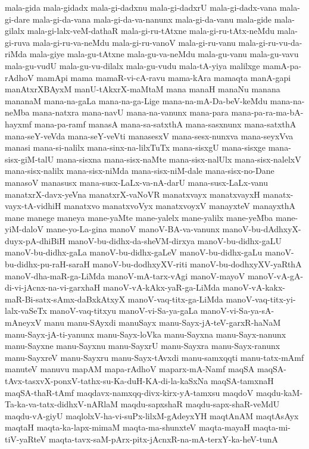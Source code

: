 {mala-gida
mala-gidadx
mala-gi-dadxnu
mala-gi-dadxrU
mala-gi-dadx-vana
mala-gi-dare
mala-gi-da-vana
mala-gi-da-va-nanunx
mala-gi-da-vanu
mala-gide
mala-gilalx
mala-gi-lalx-veM-dathaR
mala-gi-ru-tAtxne
mala-gi-ru-tAtx-neMdu
mala-gi-ruva
mala-gi-ru-va-neMdu
mala-gi-ru-vanoV
mala-gi-ru-vanu
mala-gi-ru-vu-da-riMda
mala-giye
mala-gu-tAtxne
mala-gu-va-neMdu
mala-gu-vanu
mala-gu-vavu
mala-gu-vudU
mala-gu-vu-dilalx
mala-gu-vudu
mala-tA-yiya
malilxge
mamA-pa-rAdhoV
mamApi
mama
mamaR-vi-cA-ravu
mama-kAra
mamaqta
manA-gapi
manAtxrXBAyxM
manU-tAkxrX-maMtaM
mana
manaH
manaNu
manana
mananaM
mana-na-gaLa
mana-na-ga-Lige
mana-na-mA-Da-beV-keMdu
mana-na-neMba
mana-natxra
mana-navU
mana-na-vanunx
mana-para
mana-pa-ra-ma-bA-hayxmf
mana-pa-ramf
manasA
mana-sa-satxthA
mana-sasxnunx
mana-satxthA
mana-seY-veVda
mana-seY-veVti
manasesxV
mana-sesx-nunxva
mana-seyxVva
manasi
mana-si-nalilx
mana-sinx-na-lilxTuTx
mana-sisxgU
mana-sisxge
mana-sisx-giM-talU
mana-sisxna
mana-sisx-naMte
mana-sisx-nalUlx
mana-sisx-nalelxV
mana-sisx-nalilx
mana-sisx-niMda
mana-sisx-niM-dale
mana-sisx-no-Dane
manasoV
manasusx
mana-susx-LaLx-va-nA-darU
mana-susx-LaLx-vanu
manatxrX-davx-yeVna
manatxrX-vaNoVR
manatxvayx
manatxvayxH
manatx-vayx-tA-vidhiH
manatxvo
manatxvoVyx
manatxvoyxV
manayxteV
manayxthA
mane
manege
maneya
mane-yaMte
mane-yalelx
mane-yalilx
mane-yeMba
mane-yiM-daloV
mane-yo-La-gina
manoV
manoV-BA-va-vanunx
manoV-bu-dAdhxyX-duyx-pA-dhiBiH
manoV-bu-didhx-da-sheVM-dirxya
manoV-bu-didhx-gaLU
manoV-bu-didhx-gaLa
manoV-bu-didhx-gaLeV
manoV-bu-didhx-gaLu
manoV-bu-didhx-pu-raH-saraH
manoV-bu-dodhxyXV-riti
manoV-bu-dodhxyXV-yaRthA
manoV-dha-maR-ga-LiMda
manoV-mA-tarx-vAgi
manoV-mayoV
manoV-vA-gA-di-vi-jAcnx-na-vi-garxhaH
manoV-vA-kAkx-yaR-ga-LiMda
manoV-vA-kakx-maR-Bi-satx-sAmx-daBxkAtxyX
manoV-vaq-titx-ga-LiMda
manoV-vaq-titx-yi-lalx-vaSeTx
manoV-vaq-titxyu
manoV-vi-Sa-ya-gaLa
manoV-vi-Sa-ya-sA-mAneyxV
manu
manu-SAyxdi
manuSayx
manu-Sayx-jA-teV-garxR-haNaM
manu-Sayx-jA-ti-yanunx
manu-Sayx-loVka
manu-Sayxna
manu-Sayx-nanunx
manu-Sayxne
manu-Sayxnu
manu-SayxrU
manu-Sayxra
manu-Sayx-ranunx
manu-SayxreV
manu-Sayxru
manu-Sayx-tAvxdi
manu-samxqqti
manu-tatx-mAmf
manuteV
manuvu
mapAM
mapa-rAdhoV
maparx-mA-Namf
maqSA
maqSA-tAvx-tasxvX-ponxV-tathx-su-Ka-duH-KA-di-la-kaSxNa
maqSA-tamxnaH
maqSA-thaR-tAmf
maqdavx-namxqq-divx-kirx-yA-tamxsu
maqdoV
maqdu-kaM-Ta-ka-va-tatx-didhxV-nARlaM
maqdu-sapxshaR
maqdu-sapx-shaR-veMdU
maqdu-vA-giyU
maqlolxV-ha-vi-suPx-lilxM-gAdeyxYH
maqtAnAM
maqtAsAyx
maqtaH
maqta-ka-lapx-mimaM
maqta-ma-shunxteV
maqta-mayaH
maqta-mi-tiV-yaRteV
maqta-tavx-saM-pArx-pitx-jAcnxR-na-mA-terxY-ka-heV-tunA
}
